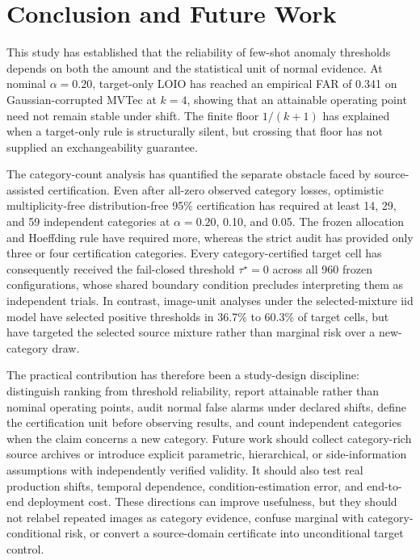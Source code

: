 \section{Conclusion and Future Work}\label{sec:conclusion}
This study has established that the reliability of few-shot anomaly thresholds depends on both the amount and the statistical unit of normal evidence. At nominal $\alpha=0.20$, target-only LOIO has reached an empirical FAR of 0.341 on Gaussian-corrupted MVTec at $k=4$, showing that an attainable operating point need not remain stable under shift. The finite floor $1/(k+1)$ has explained when a target-only rule is structurally silent, but crossing that floor has not supplied an exchangeability guarantee.

The category-count analysis has quantified the separate obstacle faced by source-assisted certification. Even after all-zero observed category losses, optimistic multiplicity-free distribution-free 95\% certification has required at least 14, 29, and 59 independent categories at $\alpha=0.20$, 0.10, and 0.05. The frozen allocation and Hoeffding rule have required more, whereas the strict audit has provided only three or four certification categories. Every category-certified target cell has consequently received the fail-closed threshold $\tau^\star=0$ across all 960 frozen configurations, whose shared boundary condition precludes interpreting them as independent trials. In contrast, image-unit analyses under the selected-mixture iid model have selected positive thresholds in 36.7\% to 60.3\% of target cells, but have targeted the selected source mixture rather than marginal risk over a new-category draw.

The practical contribution has therefore been a study-design discipline: distinguish ranking from threshold reliability, report attainable rather than nominal operating points, audit normal false alarms under declared shifts, define the certification unit before observing results, and count independent categories when the claim concerns a new category. Future work should collect category-rich source archives or introduce explicit parametric, hierarchical, or side-information assumptions with independently verified validity. It should also test real production shifts, temporal dependence, condition-estimation error, and end-to-end deployment cost. These directions can improve usefulness, but they should not relabel repeated images as category evidence, confuse marginal with category-conditional risk, or convert a source-domain certificate into unconditional target control.

